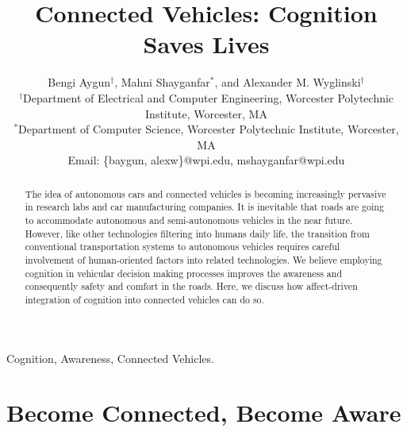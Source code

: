 \documentclass[journal, 11pt]{IEEEtran}
\begin{document}
\title{Connected Vehicles: Cognition Saves Lives}

\author{Bengi Aygun$^\dag$, Mahni Shayganfar$^*$, and Alexander M.
Wyglinski$^\dag$\\
\normalsize $^\dag$Department of Electrical and Computer Engineering, Worcester
Polytechnic Institute, Worcester, MA\\
\normalsize $^*$Department of Computer Science, Worcester Polytechnic Institute,
Worcester, MA\\
\normalsize Email: \{baygun, alexw\}@wpi.edu, mshayganfar@wpi.edu}

\maketitle

\begin{abstract}
The idea of autonomous cars and connected vehicles is becoming increasingly
pervasive in research labs and car manufacturing companies. It is inevitable
that roads are going to accommodate autonomous and semi-autonomous vehicles
in the near future. However, like other technologies filtering into humans
daily life, the transition from conventional transportation systems to
autonomous vehicles requires careful involvement of human-oriented factors into
related technologies. We believe employing cognition in vehicular decision
making processes improves the awareness and consequently safety and comfort in
the roads. Here, we discuss how affect-driven integration of cognition into
connected vehicles can do so.
\end{abstract}

\begin{keywords}
Cognition, Awareness, Connected Vehicles.
\end{keywords}%

\IEEEpeerreviewmaketitle

\section{Become Connected, Become Aware}
\end{document}
